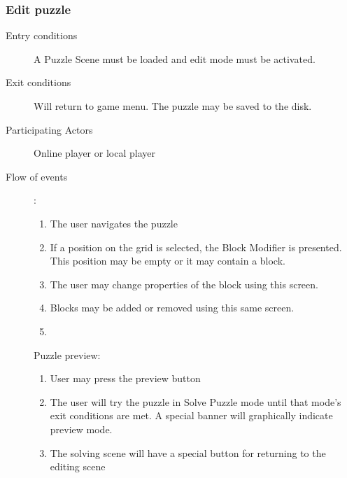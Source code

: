 \documentclass[12pt]{article}
\begin{document}
    \subsubsection{Edit puzzle}
    \begin{description}
        \item[Entry conditions] A Puzzle Scene must be loaded and edit mode
            must be activated.
        \item[Exit conditions] Will return to game menu. The puzzle may be
            saved to the disk.
        \item[Participating Actors] Online player or local player
        \item[Flow of events]:
            \begin{enumerate}
                \item The user navigates the puzzle
                \item If a position on the grid is selected, the Block Modifier
                    is presented. This position may be empty or it may
                    contain a block.
                \item The user may change properties of the block using this
                    screen.
                \item Blocks may be added or removed using this same screen.
                \item
            \end{enumerate}
            Puzzle preview:
            \begin{enumerate}
                \item User may press the preview button
                \item The user will try the puzzle in Solve Puzzle mode until
                    that mode's exit conditions are met.
                    A special banner will graphically indicate preview mode.
                \item The solving scene will have a special button for
                    returning to the editing scene
            \end{enumerate}
    \end{description}


\end{document}
